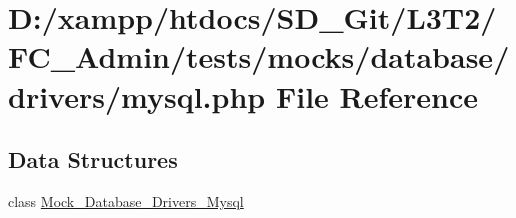 \hypertarget{_admin_2tests_2mocks_2database_2drivers_2mysql_8php}{}\section{D\+:/xampp/htdocs/\+S\+D\+\_\+\+Git/\+L3\+T2/\+F\+C\+\_\+\+Admin/tests/mocks/database/drivers/mysql.php File Reference}
\label{_admin_2tests_2mocks_2database_2drivers_2mysql_8php}
\subsection*{Data Structures}
\begin{DoxyCompactItemize}
\item 
class \hyperlink{class_mock___database___drivers___mysql}{Mock\+\_\+\+Database\+\_\+\+Drivers\+\_\+\+Mysql}
\end{DoxyCompactItemize}

